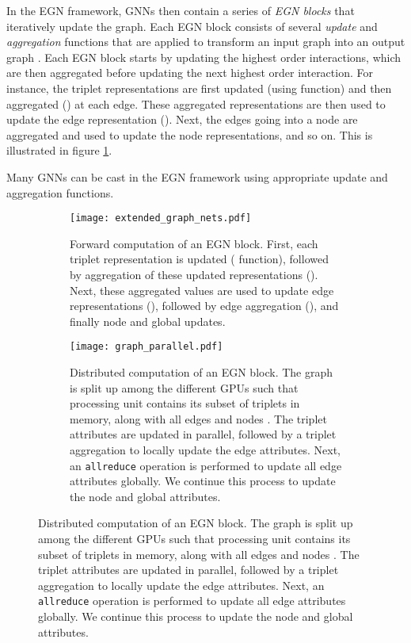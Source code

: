 \documentclass{article} \usepackage{iclr2022_conference,times}
\begin{document}
In the EGN framework, GNNs then contain a series of \emph{EGN blocks} that iteratively update the graph. Each EGN block consists of several \emph{update} and \emph{aggregation} functions that are applied to transform an input graph  into an output graph . Each EGN block starts by updating the highest order interactions, which are then aggregated before updating the next highest order interaction. For instance, the triplet representations are first updated (using  function) and then aggregated () at each edge. These aggregated representations are then used to update the edge representation (). Next, the edges going into a node are aggregated and used to update the node representations, and so on. This is illustrated in figure \ref{fig:egn_block}.











Many GNNs can be cast in the EGN framework using appropriate update and aggregation functions.





\begin{figure}[h]
\centering
    \begin{subfigure}[b]{0.9\textwidth}
        \centering
        \texttt{[image: extended\_graph\_nets.pdf]}
        \caption{Forward computation of an EGN block. First, each triplet representation is updated ( function),
        followed by aggregation of these updated representations ().
        Next, these aggregated values are used to update edge representations (), followed by edge aggregation (),
        and finally node and global updates.}
        \label{fig:egn_block}
    \end{subfigure}

    \vspace{0.2cm}
    \begin{subfigure}[b]{0.9\textwidth}
    \centering
    \texttt{[image: graph\_parallel.pdf]}
    \caption{Distributed computation of an EGN block. The graph is split up among the different GPUs such that processing unit  contains its subset of triplets  in memory, along with all edges  and nodes . The triplet attributes are updated in parallel, followed by a triplet aggregation to locally update the edge attributes. Next, an {\tt allreduce} operation is performed to update all edge attributes globally. We continue this process to update the node and global attributes.}
    \label{fig:graph_parallel}

    \end{subfigure}

    \label{Sequential and distributed computation of an EGN block.}
\end{figure}
\end{document}
